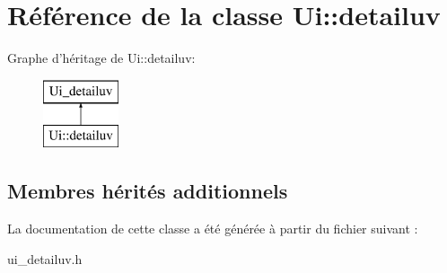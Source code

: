 \hypertarget{class_ui_1_1detailuv}{\section{Référence de la classe Ui\+:\+:detailuv}
\label{class_ui_1_1detailuv}
}
Graphe d'héritage de Ui\+:\+:detailuv\+:\begin{figure}[H]
\begin{center}
\leavevmode
\includegraphics[height=2.000000cm]{class_ui_1_1detailuv}
\end{center}
\end{figure}
\subsection*{Membres hérités additionnels}


La documentation de cette classe a été générée à partir du fichier suivant \+:\begin{DoxyCompactItemize}
\item 
ui\+\_\+detailuv.\+h\end{DoxyCompactItemize}
